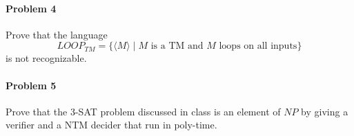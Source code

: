 \documentclass{article}
\begin{document}
\paragraph{Problem 4} Prove that the language
\[ LOOP_{TM} = \{ \langle M \rangle \;|\; M \text{ is a TM and $M$ loops on all inputs} \} \]
is not recognizable.

\paragraph{Problem 5} Prove that the 3-SAT problem discussed in class is an element of $NP$ by
giving a verifier and a NTM decider that run in poly-time.
\end{document}
